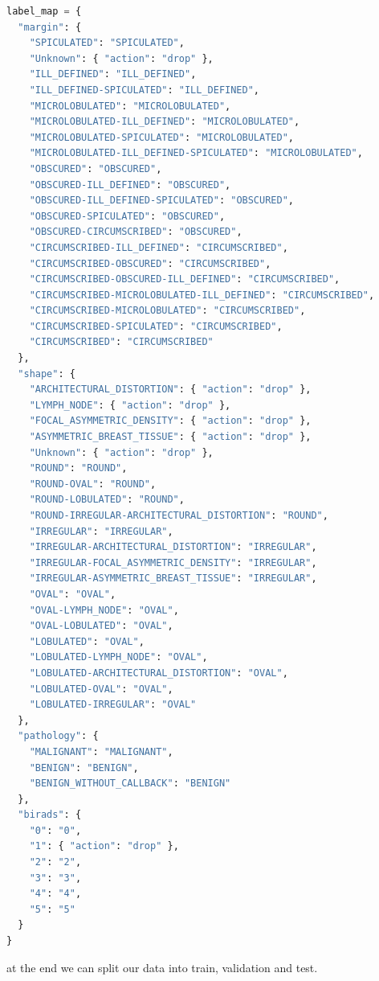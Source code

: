 \documentclass[11pt,a4paper]{article}
\begin{document}
\begin{lstlisting}[language=Python, caption=Labels conversations]
label_map = {
  "margin": {
    "SPICULATED": "SPICULATED",
    "Unknown": { "action": "drop" },
    "ILL_DEFINED": "ILL_DEFINED",
    "ILL_DEFINED-SPICULATED": "ILL_DEFINED",
    "MICROLOBULATED": "MICROLOBULATED",
    "MICROLOBULATED-ILL_DEFINED": "MICROLOBULATED",
    "MICROLOBULATED-SPICULATED": "MICROLOBULATED",
    "MICROLOBULATED-ILL_DEFINED-SPICULATED": "MICROLOBULATED",
    "OBSCURED": "OBSCURED",
    "OBSCURED-ILL_DEFINED": "OBSCURED",
    "OBSCURED-ILL_DEFINED-SPICULATED": "OBSCURED",
    "OBSCURED-SPICULATED": "OBSCURED",
    "OBSCURED-CIRCUMSCRIBED": "OBSCURED",
    "CIRCUMSCRIBED-ILL_DEFINED": "CIRCUMSCRIBED",
    "CIRCUMSCRIBED-OBSCURED": "CIRCUMSCRIBED",
    "CIRCUMSCRIBED-OBSCURED-ILL_DEFINED": "CIRCUMSCRIBED",
    "CIRCUMSCRIBED-MICROLOBULATED-ILL_DEFINED": "CIRCUMSCRIBED",
    "CIRCUMSCRIBED-MICROLOBULATED": "CIRCUMSCRIBED",
    "CIRCUMSCRIBED-SPICULATED": "CIRCUMSCRIBED",
    "CIRCUMSCRIBED": "CIRCUMSCRIBED"
  },
  "shape": {
    "ARCHITECTURAL_DISTORTION": { "action": "drop" },
    "LYMPH_NODE": { "action": "drop" },
    "FOCAL_ASYMMETRIC_DENSITY": { "action": "drop" },
    "ASYMMETRIC_BREAST_TISSUE": { "action": "drop" },
    "Unknown": { "action": "drop" },
    "ROUND": "ROUND",
    "ROUND-OVAL": "ROUND",
    "ROUND-LOBULATED": "ROUND",
    "ROUND-IRREGULAR-ARCHITECTURAL_DISTORTION": "ROUND",
    "IRREGULAR": "IRREGULAR",
    "IRREGULAR-ARCHITECTURAL_DISTORTION": "IRREGULAR",
    "IRREGULAR-FOCAL_ASYMMETRIC_DENSITY": "IRREGULAR",
    "IRREGULAR-ASYMMETRIC_BREAST_TISSUE": "IRREGULAR",
    "OVAL": "OVAL",
    "OVAL-LYMPH_NODE": "OVAL",
    "OVAL-LOBULATED": "OVAL",
    "LOBULATED": "OVAL",
    "LOBULATED-LYMPH_NODE": "OVAL",
    "LOBULATED-ARCHITECTURAL_DISTORTION": "OVAL",
    "LOBULATED-OVAL": "OVAL",
    "LOBULATED-IRREGULAR": "OVAL"
  },
  "pathology": {
    "MALIGNANT": "MALIGNANT",
    "BENIGN": "BENIGN",
    "BENIGN_WITHOUT_CALLBACK": "BENIGN"
  },
  "birads": {
    "0": "0",
    "1": { "action": "drop" },
    "2": "2",
    "3": "3",
    "4": "4",
    "5": "5"
  }
}
\end{lstlisting}

at the end we can split our data into train, validation and test.
\end{document}
